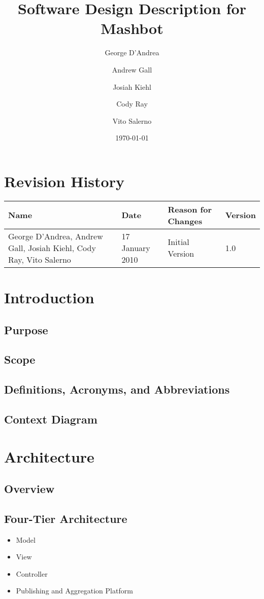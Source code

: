 \documentclass{article}
\begin{document}
\title{Software Design Description for Mashbot} 
\author{George D'Andrea \and Andrew Gall \and Josiah Kiehl \and
  Cody Ray \and Vito Salerno}
\date{\today}
\begin{titlepage}
\maketitle
\end{titlepage}

\section*{Revision History}
\begin{tabular}{|p{2in}|l|l|l|}
  \hline
  \textbf{Name} & \textbf{Date} & \textbf{Reason for Changes} & \textbf{Version} \\
  \hline \hline
  George D'Andrea, Andrew Gall, Josiah Kiehl, Cody Ray, Vito
  Salerno & 17 January 2010 & Initial Version & 1.0 \\
  \hline
\end{tabular}

\clearpage
\tableofcontents
\clearpage

\section{Introduction}
\subsection{Purpose}
\subsection{Scope}
\subsection{Definitions, Acronyms,   and Abbreviations}
\subsection{Context Diagram}
\section{Architecture}
\subsection{Overview}
\subsection{Four-Tier Architecture}
\begin{itemize}
\item Model
\item View
\item Controller
\item Publishing and Aggregation Platform
\end{itemize}
\end{document}
